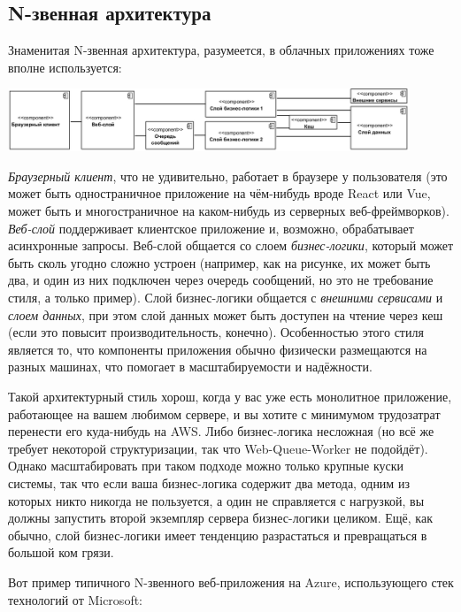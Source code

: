 \documentclass[a5paper]{article}
\begin{document}
\subsection{N-звенная архитектура}

Знаменитая N-звенная архитектура, разумеется, в облачных приложениях тоже вполне используется: 

\begin{center}
    \includegraphics[width=0.9\textwidth]{nTierArchitecture.png}
\end{center}

\emph{Браузерный клиент}, что не удивительно, работает в браузере у пользователя (это может быть одностраничное приложение на чём-нибудь вроде React или Vue, может быть и многостраничное на каком-нибудь из серверных веб-фреймворков). \emph{Веб-слой} поддерживает клиентское приложение и, возможно, обрабатывает асинхронные запросы. Веб-слой общается со слоем \emph{бизнес-логики}, который может быть сколь угодно сложно устроен (например, как на рисунке, их может быть два, и один из них подключен через очередь сообщений, но это не требование стиля, а только пример). Слой бизнес-логики общается с \emph{внешними сервисами} и \emph{слоем данных}, при этом слой данных может быть доступен на чтение через кеш (если это повысит производительность, конечно). Особенностью этого стиля является то, что компоненты приложения обычно физически размещаются на разных машинах, что помогает в масштабируемости и надёжности.

Такой архитектурный стиль хорош, когда у вас уже есть монолитное приложение, работающее на вашем любимом сервере, и вы хотите с минимумом трудозатрат перенести его куда-нибудь на AWS. Либо бизнес-логика несложная (но всё же требует некоторой структуризации, так что Web-Queue-Worker не подойдёт). Однако масштабировать при таком подходе можно только крупные куски системы, так что если ваша бизнес-логика содержит два метода, одним из которых никто никогда не пользуется, а один не справляется с нагрузкой, вы должны запустить второй экземпляр сервера бизнес-логики целиком. Ещё, как обычно, слой бизнес-логики имеет тенденцию разрастаться и превращаться в большой ком грязи.

Вот пример типичного N-звенного веб-приложения на Azure, использующего стек технологий от Microsoft:
\end{document}
